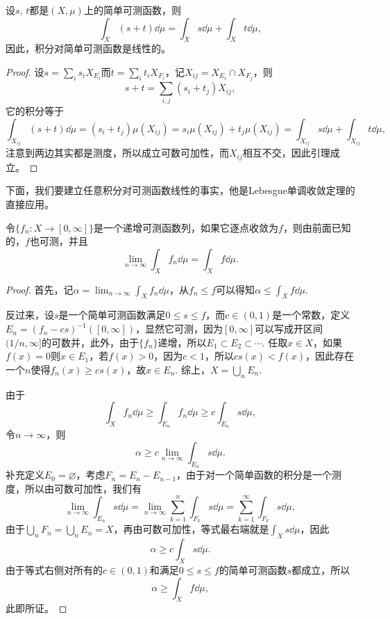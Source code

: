 \begin{lem}
设$s$, $t$都是$(X,\mu)$上的简单可测函数，则
\[
	\int_X (s+t)\dd \mu=\int_X s\dd \mu+\int_X t\dd \mu,
\]
因此，积分对简单可测函数是线性的。
\end{lem}

\begin{proof}
设$s=\sum_i s_i X_{E_i}$而$t=\sum_i t_i X_{F_i}$，记$X_{ij}=X_{E_i}\cap X_{F_j}$，则
\[
	s+t=\sum_{i,j}(s_i+t_j) X_{ij},
\]
它的积分等于
\[
	\int_{X_{ij}} (s+t)\dd \mu= (s_i+t_j)\mu(X_{ij})=s_i\mu(X_{ij})+t_j\mu(X_{ij})=\int_{X_{ij}} s\dd \mu+\int_{X_{ij}} t\dd \mu,
\]
注意到两边其实都是测度，所以成立可数可加性，而$X_{ij}$相互不交，因此引理成立。
\end{proof}

下面，我们要建立任意积分对可测函数线性的事实，他是Lebesgue单调收敛定理的直接应用。

\begin{thm}[Lebesgue单调收敛定理]
令$\{f_n:X\to [0,\infty]\}$是一个递增可测函数列，如果它逐点收敛为$f$，则由前面已知的，$f$也可测，并且
\[
	\lim_{n\to \infty} \int_X f_n \dd \mu=\int_X f \dd \mu.
\]
\end{thm}

\begin{proof}
首先，记$\alpha=\lim_{n\to \infty} \int_X f_n \dd \mu$，从$f_n\leq f$可以得知$\alpha\leq \int_X f \dd \mu$. 

反过来，设$s$是一个简单可测函数满足$0\leq s\leq f$，而$c\in (0,1)$是一个常数，定义$E_n=(f_n-cs)^{-1}([0,\infty])$，显然它可测，因为$[0,\infty]$可以写成开区间$(1/n,\infty]$的可数并，此外，由于$\{f_n\}$递增，所以$E_1\subset E_2\subset \cdots$. 任取$x\in X$，如果$f(x)=0$则$x\in E_1$，若$f(x)>0$，因为$c<1$，所以$cs(x)<f(x)$，因此存在一个$n$使得$f_n(x)\geq cs(x)$，故$x\in E_n$. 综上，$X=\bigcup_n E_n$.

由于
\[
	\int_X f_n \dd \mu\geq \int_{E_n} f_n \dd\mu\geq c\int_{E_n} s \dd\mu,
\]
令$n\to \infty$，则
\[
	\alpha \geq c\lim_{n\to \infty}\int_{E_n} s \dd\mu.
\]
补充定义$E_0=\varnothing$，考虑$F_n=E_{n}-E_{n-1}$，由于对一个简单函数的积分是一个测度，所以由可数可加性，我们有
\[
	\lim_{n\to \infty}\int_{E_n} s \dd\mu=\lim_{n\to \infty}\sum_{k=1}^n\int_{F_k} s \dd\mu=\sum_{k=1}^\infty\int_{F_k} s \dd\mu,
\]
由于$\bigcup_n F_n=\bigcup_n E_n=X$，再由可数可加性，等式最右端就是$\int_{X} s \dd\mu$，因此
\[
	\alpha \geq c\int_{X} s \dd\mu.
\]
由于等式右侧对所有的$c\in (0,1)$和满足$0\leq s\leq f$的简单可测函数$s$都成立，所以
\[
	\alpha \geq \int_{X} f \dd\mu,
\]
此即所证。
\end{proof}


